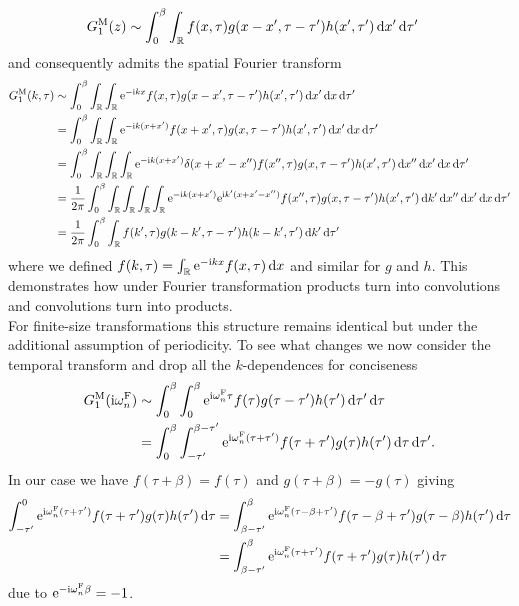 \documentclass[english, parskip=full]{scrartcl}
\begin{document}
\begin{align}
G_1^{\text{M}}(z) &\sim \int_{0}^{\beta} \int_{\mathbb{R}} f(x,\tau) g(x-x',\tau-\tau') h(x',\tau') \, \mathrm{d}x'  \,\mathrm{d}\tau'
\end{align}
and consequently admits the spatial Fourier transform
\begin{align}
G_1^{\text{M}}(k,\tau) &\sim \int_{0}^{\beta}  \int_{\mathbb{R}} \int_{\mathbb{R}} \text{e}^{-\text{i} kx} f(x,\tau) g(x-x',\tau-\tau') h(x',\tau') \, \mathrm{d}x'  \, \mathrm{d}x  \,\mathrm{d}\tau'\\
&= \int_{0}^{\beta}  \int_{\mathbb{R}} \int_{\mathbb{R}} \text{e}^{-\text{i} k(x+x')} f(x+x',\tau) g(x,\tau-\tau') h(x',\tau') \, \mathrm{d}x'  \, \mathrm{d}x  \,\mathrm{d}\tau'\\
&= \int_{0}^{\beta}  \int_{\mathbb{R}} \int_{\mathbb{R}} \int_{\mathbb{R}} \text{e}^{-\text{i} k(x+x')} \delta(x+x'-x'') f(x'',\tau) g(x,\tau-\tau') h(x',\tau') \, \mathrm{d}x''  \, \mathrm{d}x'  \, \mathrm{d}x   \,\mathrm{d}\tau'\\
&= \frac{1}{2\pi} \int_{0}^{\beta}  \int_{\mathbb{R}} \int_{\mathbb{R}} \int_{\mathbb{R}} \int_{\mathbb{R}} \text{e}^{-\text{i} k(x+x')} \text{e}^{\text{i} k'(x+x'-x'')} f(x'',\tau) g(x,\tau-\tau') h(x',\tau') \, \mathrm{d}k' \, \mathrm{d}x''  \, \mathrm{d}x'  \, \mathrm{d}x   \,\mathrm{d}\tau'\\
&= \frac{1}{2\pi} \int_{0}^{\beta}  \int_{\mathbb{R}} f(k',\tau) g(k-k',\tau-\tau') h(k-k',\tau') \, \mathrm{d}k'   \,\mathrm{d}\tau'
\end{align}
where we defined $f(k,\tau) = \int_{\mathbb{R}} \text{e}^{-\text{i} kx} f(x,\tau) \, \mathrm{d}x$ and similar for $g$ and $h$.
This demonstrates how under Fourier transformation products turn into convolutions and convolutions turn into products.\\
For finite-size transformations this structure remains identical but under the additional assumption of periodicity.
To see what changes we now consider the temporal transform and drop all the $k$-dependences for conciseness
\begin{align}
G_1^{\text{M}}(\text{i}\omega_n^{\text{F}}) &\sim \int_{0}^{\beta} \int_{0}^{\beta} \text{e}^{\text{i}\omega_n^{\text{F}}\tau} f(\tau) g(\tau-\tau') h(\tau') \,\mathrm{d}\tau' \,\mathrm{d}\tau\\
&= \int_{0}^{\beta} \int_{-\tau'}^{\beta-\tau'} \text{e}^{\text{i}\omega_n^{\text{F}}(\tau+\tau')} f(\tau+\tau') g(\tau) h(\tau') \,\mathrm{d}\tau \,\mathrm{d}\tau'.
\end{align}
In our case we have $f(\tau+\beta)=f(\tau)$ and $g(\tau+\beta)=-g(\tau)$ giving
\begin{align}
\int_{-\tau'}^{0} \text{e}^{\text{i}\omega_n^{\text{F}}(\tau+\tau')} f(\tau+\tau') g(\tau) h(\tau') \,\mathrm{d}\tau &= \int_{\beta-\tau'}^{\beta} \text{e}^{\text{i}\omega_n^{\text{F}}(\tau-\beta+\tau')} f(\tau-\beta+\tau') g(\tau-\beta) h(\tau') \,\mathrm{d}\tau \\
&= \int_{\beta-\tau'}^{\beta} \text{e}^{\text{i}\omega_n^{\text{F}}(\tau+\tau')} f(\tau+\tau') g(\tau) h(\tau') \,\mathrm{d}\tau
\end{align}
due to $\text{e}^{-\text{i}\omega_n^{\text{F}}\beta} = -1$.
\end{document}
